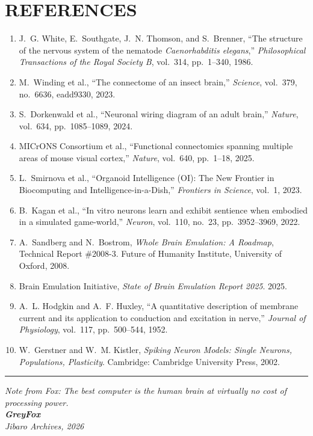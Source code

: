 \documentclass[11pt,a4paper]{article}
\begin{document}
\section*{REFERENCES}

\begin{enumerate}
\setlength{\itemsep}{0.35em}

\item J.~G. White, E.~Southgate, J.~N. Thomson, and S.~Brenner, ``The structure of the nervous system of the nematode \textit{Caenorhabditis elegans},'' \textit{Philosophical Transactions of the Royal Society B}, vol.~314, pp.~1--340, 1986.

\item M.~Winding et al., ``The connectome of an insect brain,'' \textit{Science}, vol.~379, no.~6636, eadd9330, 2023.

\item S.~Dorkenwald et al., ``Neuronal wiring diagram of an adult brain,'' \textit{Nature}, vol.~634, pp.~1085--1089, 2024.

\item MICrONS Consortium et al., ``Functional connectomics spanning multiple areas of mouse visual cortex,'' \textit{Nature}, vol.~640, pp.~1--18, 2025.

\item L.~Smirnova et al., ``Organoid Intelligence (OI): The New Frontier in Biocomputing and Intelligence-in-a-Dish,'' \textit{Frontiers in Science}, vol.~1, 2023.

\item B.~Kagan et al., ``In vitro neurons learn and exhibit sentience when embodied in a simulated game-world,'' \textit{Neuron}, vol.~110, no.~23, pp.~3952--3969, 2022.

\item A.~Sandberg and N.~Bostrom, \textit{Whole Brain Emulation: A Roadmap}, Technical Report \#2008-3. Future of Humanity Institute, University of Oxford, 2008.

\item Brain Emulation Initiative, \textit{State of Brain Emulation Report 2025}. 2025.

\item A.~L. Hodgkin and A.~F. Huxley, ``A quantitative description of membrane current and its application to conduction and excitation in nerve,'' \textit{Journal of Physiology}, vol.~117, pp.~500--544, 1952.

\item W.~Gerstner and W.~M. Kistler, \textit{Spiking Neuron Models: Single Neurons, Populations, Plasticity}. Cambridge: Cambridge University Press, 2002.

\end{enumerate}

\vspace{0.6em}
\noindent\rule{\textwidth}{0.4pt}

\begin{center}
\itshape Note from Fox: The best computer is the human brain at virtually no cost of processing power.\\[0.6em]
\upshape\textbf{GreyFox}\\[0.3em]
\itshape Jibaro Archives, 2026
\end{center}
\end{document}
